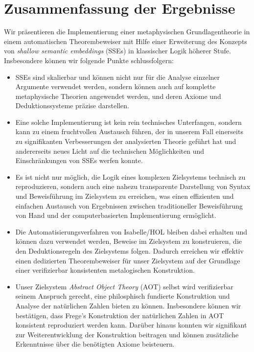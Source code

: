 \documentclass[a4paper,enabledeprecatedfontcommands,abstract=on,twoside=true]{scrreprt}
\numberwithin{TODO}{chapter}
\numberwithin{equation}{section}
\begin{document}
\restoregeometry

\newpage

\printbibliography[heading=bibintoc]

\cleardoublepage

\pagestyle{plain}

\section*{Zusammenfassung der Ergebnisse}

Wir pr\"asentieren die Implementierung einer metaphysischen Grundlagentheorie in einem automatischen Theorembeweiser mit Hilfe einer Erweiterung des Konzepts von \emph{shallow semantic embeddings} (SSEs) in klassischer Logik h\"oherer Stufe. Insbesondere k\"onnen wir folgende Punkte schlussfolgern:

\begin{itemize}
\item SSEs sind skalierbar und k\"onnen nicht nur für die Analyse einzelner Argumente verwendet werden, sondern k\"onnen auch auf komplette metaphysische Theorien angewendet werden, und deren Axiome und Deduktionssysteme pr\"azise darstellen.
\item Eine solche Implementierung ist kein rein technisches Unterfangen, sondern kann zu einem fruchtvollen Austausch f\"uhren, der in unserem Fall einerseits zu signifikanten Verbesserungen der analysierten Theorie gef\"uhrt hat und andererseits neues Licht auf die technischen Möglichkeiten und Einschränkungen von SSEs werfen konnte.
\item Es ist nicht nur möglich, die Logik eines komplexen Zielsystems technisch zu reproduzieren, sondern auch eine nahezu transparente Darstellung von Syntax und Beweisf\"uhrung im Zielsystem zu erreichen, was einen effizienten und einfachen Austausch von Ergebnissen zwischen traditioneller Beweisf\"uhrung von Hand und der computerbasierten Implementierung ermöglicht.
\item Die Automatisierungsverfahren von Isabelle/HOL bleiben dabei erhalten und können dazu verwendet werden, Beweise im Zielsystem zu konstruieren, die den Deduktionsregeln des Zielsystems folgen. Dadurch erreichen wir effektiv einen dedizierten Theorembeweiser für unser Zielsystem auf der Grundlage einer verifizierbar konsistenten metalogischen Konstruktion.
\item Unser Zielsystem \emph{Abstract Object Theory} (AOT) selbst wird verifizierbar seinem Anspruch gerecht, eine philosphisch fundierte Konstruktion und Analyse der nat\"urlichen Zahlen bieten zu k\"onnen. Insbesondere k\"onnen wir bestätigen, dass Frege's Konstruktion der nat\"urlichen Zahlen in AOT konsistent reproduziert werden kann. Dar\"uber hinaus konnten wir signifikant zur Weiterentwicklung der Konstruktion beitragen und k\"onnen zusätzliche Erkenntnisse \"uber die ben\"otigten Axiome beisteuern.
\end{itemize}
\end{document}
